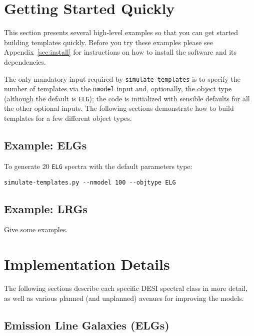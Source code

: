 \documentclass[12pt]{article}
\newcommand{\simt}{{\tt simulate-templates}}
\begin{document}
\section{Getting Started Quickly}

This section presents several high-level examples so that you can get started
building templates quickly.  Before you try these examples please see
Appendix~\ref{sec:install} for instructions on how to install the software and
its dependencies.

The only mandatory input required by \simt{} is to specify the number of
templates via the {\tt nmodel} input and, optionally, the object type (although
the default is {\tt ELG}); the code is initialized with sensible defaults for
all the other optional inputs.  The following sections demonstrate how to build
templates for a few different object types.

\subsection{Example: ELGs}

To generate 20 {\tt ELG} spectra with the default parameters type:

\begin{verbatim}
simulate-templates.py --nmodel 100 --objtype ELG
\end{verbatim}

\subsection{Example: LRGs}

Give some examples.

\section{Implementation Details}

The following sections describe each specific DESI spectral class in more
detail, as well as various planned (and unplanned) avenues for improving the
models.


\subsection{Emission Line Galaxies (ELGs)}
\end{document}
